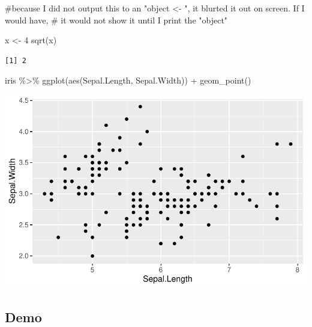 \documentclass[
  letterpaper,
  DIV=11,
  numbers=noendperiod]{scrartcl}
\newenvironment{Shaded}{\begin{snugshade}}{\end{snugshade}}
\newcommand{\CommentTok}[1]{\textcolor[rgb]{0.37,0.37,0.37}{#1}}
\newcommand{\DecValTok}[1]{\textcolor[rgb]{0.68,0.00,0.00}{#1}}
\newcommand{\FunctionTok}[1]{\textcolor[rgb]{0.28,0.35,0.67}{#1}}
\newcommand{\NormalTok}[1]{\textcolor[rgb]{0.00,0.23,0.31}{#1}}
\newcommand{\OtherTok}[1]{\textcolor[rgb]{0.00,0.23,0.31}{#1}}
\newcommand{\SpecialCharTok}[1]{\textcolor[rgb]{0.37,0.37,0.37}{#1}}
\begin{document}
\begin{Shaded}
\begin{Highlighting}[]
\CommentTok{\#because I did not output this to an "object \textless{}{-} ", it blurted it out on screen. If I would have, \# it would not show it until I print the "object"}
\end{Highlighting}
\end{Shaded}

\begin{Shaded}
\begin{Highlighting}[]
\NormalTok{x }\OtherTok{\textless{}{-}} \DecValTok{4}
\FunctionTok{sqrt}\NormalTok{(x)}
\end{Highlighting}
\end{Shaded}

\begin{verbatim}
[1] 2
\end{verbatim}

\begin{Shaded}
\begin{Highlighting}[]
\NormalTok{iris }\SpecialCharTok{\%\textgreater{}\%} 
  \FunctionTok{ggplot}\NormalTok{(}\FunctionTok{aes}\NormalTok{(Sepal.Length, Sepal.Width)) }\SpecialCharTok{+}
  \FunctionTok{geom\_point}\NormalTok{()}
\end{Highlighting}
\end{Shaded}

\includegraphics{AS_day5-tidyverse-template_files/figure-pdf/unnamed-chunk-6-1.pdf}

\subsection{Demo}\label{demo-2}
\end{document}
